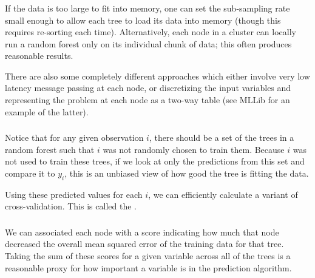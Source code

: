 \documentclass[xetex,mathserif,serif,aspectratio=169]{beamer}
\begin{document}
\begin{frame}[fragile] \frametitle{} \oldB \small

\textbf{}

If the data is too large to fit into memory, one can set the
sub-sampling rate small enough to allow each tree to load its data into memory
(though this requires re-sorting each time). Alternatively, each node in
a cluster can locally run a random forest only on its individual chunk of data;
this often produces reasonable results.

There are also some completely different approaches which either involve
very low latency message passing at each node, or discretizing the input
variables and representing the problem at each node as a two-way table
(see MLLib for an example of the latter).

\end{frame}

\begin{frame}[fragile] \frametitle{} \oldB \small

\textbf{}

Notice that for any given observation $i$, there should be a
set of the trees in a random forest such that $i$ was not
randomly chosen to train them. Because $i$ was not used to
train these trees, if we look at only the predictions from
this set and compare it to $y_i$, this is an unbiased view
of how good the tree is fitting the data.

Using these predicted values for each $i$, we can efficiently
calculate a variant of cross-validation. This is called the
.

\end{frame}

\begin{frame}[fragile] \frametitle{} \oldB \small

\textbf{}

We can associated each node with a score indicating how much
that node decreased the overall mean squared error of the
training data for that tree. Taking the sum of these scores
for a given variable across all of the trees is a reasonable
proxy for how important a variable is in the prediction
algorithm.

\end{frame}
\end{document}
